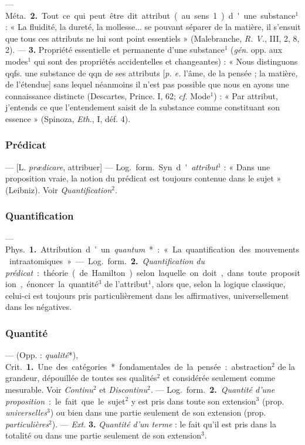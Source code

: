 — \si{Méta.} {\bf 2.} Tout ce qui peut être
dit attribut (au sens 1) d'une substance$^1$ : « La fluidité, la dureté, la
mollesse... se pouvant séparer de la
matière, il s'ensuit que tous ces
attributs ne lui sont point essentiels » (Malebranche, {\it R. V.}, III, 2,
8, 2). — {\bf 3.} Propriété essentielle et
permanente d’une substance$^1$ ({\it gén}.
opp. aux modes$^1$ qui sont des propriétés accidentelles et changeantes) :
« Nous distinguons qqfs. une substance de qqn de ses attributs [{\it p. e.}
l'âme, de la pensée ; la matière, de
l'étendue] sans lequel néanmoins il
n’est pas possible que nous en ayons
une connaissance distincte (Descartes, Prince. I, 62; {\it cf.}  Mode$^1$) :
« Par attribut, j'entends ce que
l’entendement saisit de la substance
comme constituant son essence »
(Spinoza, {\it Eth.}, I, déf. 4).


\subsubsection{Prédicat}
 — [L. {\it prædicare}, attribuer] — \si{Log.} \si{form.} Syn.
d'{\it attribut}$^1$ : « Dans une proposition vraie, la notion du prédicat
est toujours contenue dans le sujet » (Leibniz). Voir
{\it Quantification}$^2$.

\subsubsection{Quantification}
 — \si{Phys.} {\bf 1.} Attribution d’un {\it quantum}* : «
La quantification des mouvements intraatomiques ». — \si{Log.} \si{form.}
{\bf 2.} {\it Quantification du prédicat} : théorie (de Hamilton) selon
laquelle on doit,
dans toute proposition, énoncer la quantité$^3$ de l’attribut$^1$, alors que,
selon la logique classique, celui-ci est toujours pris particulièrement dans
les affirmatives, universellement dans les négatives.

\subsubsection{Quantité}
 — (Opp. : {\it qualité}*), \si{Crit.} {\bf 1.} Une des
catégories* fondamentales de la pensée : abstraction$^2$ de la grandeur,
dépouillée de toutes ses qualités$^2$ et considérée seulement comme
mesurable. Voir {\it Continu}$^2$ et {\it Discontinu}$^2$. — \si{Log.}
\si{form.} {\bf 2.} {\it Quantité d'une proposition} : le fait que le
sujet$^2$ y est pris dans toute son extension$^3$ (prop.
{\it universelles}$^3$) ou bien dans une partie seulement de son extension
(prop. {\it particulières}$^2$). — {\it Ext.} {\bf 3.} {\it Quantité d'un
terme} : le fait qu'il est pris dans la totalité ou dans une partie seulement
de son extension$^3$.

